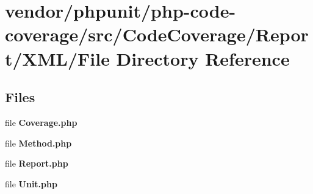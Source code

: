 \section{vendor/phpunit/php-\/code-\/coverage/src/\+Code\+Coverage/\+Report/\+X\+M\+L/\+File Directory Reference}
\label{dir_dc7fe7ab63d370d33b9f6eeea48d8d99}
\subsection*{Files}
\begin{DoxyCompactItemize}
\item 
file {\bf Coverage.\+php}
\item 
file {\bf Method.\+php}
\item 
file {\bf Report.\+php}
\item 
file {\bf Unit.\+php}
\end{DoxyCompactItemize}
